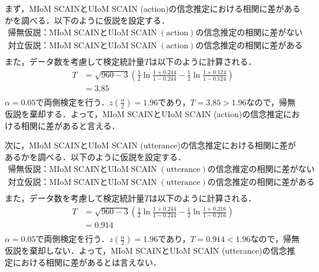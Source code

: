 \par
まず，MIoM SCAINとUIoM SCAIN (action)の信念推定における相関に差があるかを調べる．以下のように仮説を設定する．
\begin{displaymath}
  \begin{split}
  \label{z_a_b_p}
  \mathrm{帰無仮説：MIoM\; SCAINとUIoM\; SCAIN\; (action)の信念推定の相関に差がない}\\
  \mathrm{対立仮説：MIoM\; SCAINとUIoM\; SCAIN\; (action)の信念推定の相関に差がある}\\
  \end{split}
\end{displaymath}
また，データ数を考慮して検定統計量$T$は以下のように計算される．
\begin{displaymath}
  \begin{split}
  \label{z_a_b}
  T&=\sqrt{960-3}\left(\frac{1}{2}\ln{\frac{1+0.244}{1-0.244}-\frac{1}{2}\ln{\frac{1+0.124}{1-0.124}}}\right)\\
  &=3.85\\
  \end{split}
\end{displaymath}
$\alpha=0.05$で両側検定を行う．$z\left(\frac{\alpha}{2}\right)=1.96$であり，$T=3.85>1.96$なので，帰無仮説を棄却する．よって，MIoM SCAINとUIoM SCAIN (action)の信念推定における相関に差があると言える．

\par
次に，MIoM SCAINとUIoM SCAIN (utterance)の信念推定における相関に差があるかを調べる．以下のように仮説を設定する．
\begin{displaymath}
  \begin{split}
    \label{z_a_b}
    \mathrm{帰無仮説：MIoM\; SCAINとUIoM\; SCAIN\; (utterance)の信念推定の相関に差がない}\\
    \mathrm{対立仮説：MIoM\; SCAINとUIoM\; SCAIN\; (utterance)の信念推定の相関に差がある}\\
    \end{split}
\end{displaymath}
また，データ数を考慮して検定統計量$T$は以下のように計算される．
\begin{displaymath}
  \begin{split}
  \label{z_a_b}
  T&=\sqrt{960-3}\left(\frac{1}{2}\ln{\frac{1+0.244}{1-0.244}-\frac{1}{2}\ln{\frac{1+0.216}{1-0.216}}}\right)\\
  &=0.914\\
  \end{split}
\end{displaymath}
$\alpha=0.05$で両側検定を行う．$z\left(\frac{\alpha}{2}\right)=1.96$であり，$T=0.914<1.96$なので，帰無仮説を棄却しない．よって，MIoM SCAINとUIoM SCAIN (utterance)の信念推定における相関に差があるとは言えない．

